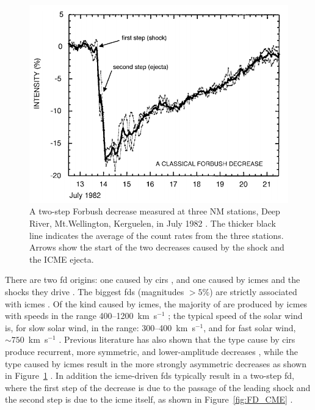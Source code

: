 \begin{figure}[ht!]
	\centering
	\includegraphics[width=0.75\columnwidth]{FD_plot.png}
	\caption{A two-step Forbush decrease measured at three NM stations, Deep River, Mt.Wellington, Kerguelen, in July 1982 \citep{cane_coronal_2000}. The thicker black line indicates the average of the count rates from the three stations. Arrows show the start of the two decreases caused by the shock and the ICME ejecta.}
	\label{fig:FD_plot}
\end{figure}

There are two \gls{fd} origins: one caused by \glspl{cir} \citep{dumbovic_forbush_2016}, and one caused by \glspl{icme} and the shocks they drive \citep{belov_forbush_2008}. The biggest \glspl{fd} (magnitudes $> 5\%$) are strictly associated with \glspl{icme} \citep{belov_what_2001}. Of the kind caused by \glspl{icme}, the majority of are produced by \glspl{icme} with speeds in the range 400--1200~km~s$^{-1}$ \citep{lingri_forbush_2016}; the typical speed of the solar wind is, for slow solar wind, in the range: 300--400~km~s$^{-1}$, and for fast solar wind, $\sim 750$~km~s$^{-1}$ \citep{owens_heliospheric_2013}. Previous literature has also shown that the type cause by \glspl{cir} produce recurrent, more symmetric, and lower-amplitude decreases \citep{dumbovic_cosmic_2012}, while the type caused by \glspl{icme} result in the more strongly asymmetric decreases as shown in Figure~\ref{fig:FD_plot} \citep{lockwood_forbush_1971, cane_coronal_2000, dumbovic_cosmic_2012}. In addition the \gls{icme}-driven \glspl{fd} typically result in a two-step \gls{fd}, where the first step of the decrease is due to the passage of the leading shock and the second step is due to the \gls{icme} itself, as shown in Figure~\ref{fig:FD_CME} \citep{cane_coronal_2000}.


